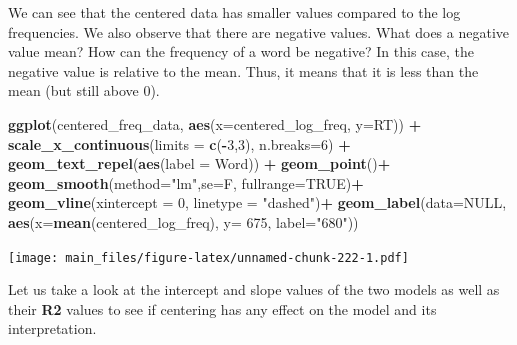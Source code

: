 \documentclass[
]{book}
\newenvironment{Shaded}{\begin{snugshade}}{\end{snugshade}}
\newcommand{\AttributeTok}[1]{\textcolor[rgb]{0.13,0.29,0.53}{#1}}
\newcommand{\ConstantTok}[1]{\textcolor[rgb]{0.56,0.35,0.01}{#1}}
\newcommand{\DecValTok}[1]{\textcolor[rgb]{0.00,0.00,0.81}{#1}}
\newcommand{\FunctionTok}[1]{\textcolor[rgb]{0.13,0.29,0.53}{\textbf{#1}}}
\newcommand{\NormalTok}[1]{#1}
\newcommand{\SpecialCharTok}[1]{\textcolor[rgb]{0.81,0.36,0.00}{\textbf{#1}}}
\newcommand{\StringTok}[1]{\textcolor[rgb]{0.31,0.60,0.02}{#1}}
\begin{document}
We can see that the centered data has smaller values compared to the log frequencies. We also observe that there are negative values. What does a negative value mean? How can the frequency of a word be negative? In this case, the negative value is relative to the mean. Thus, it means that it is less than the mean (but still above 0).

\begin{Shaded}
\begin{Highlighting}[]
\FunctionTok{ggplot}\NormalTok{(centered\_freq\_data, }\FunctionTok{aes}\NormalTok{(}\AttributeTok{x=}\NormalTok{centered\_log\_freq, }\AttributeTok{y=}\NormalTok{RT)) }\SpecialCharTok{+}
  \FunctionTok{scale\_x\_continuous}\NormalTok{(}\AttributeTok{limits =} \FunctionTok{c}\NormalTok{(}\SpecialCharTok{{-}}\DecValTok{3}\NormalTok{,}\DecValTok{3}\NormalTok{), }\AttributeTok{n.breaks=}\DecValTok{6}\NormalTok{) }\SpecialCharTok{+}
  \FunctionTok{geom\_text\_repel}\NormalTok{(}\FunctionTok{aes}\NormalTok{(}\AttributeTok{label =}\NormalTok{ Word)) }\SpecialCharTok{+}
  \FunctionTok{geom\_point}\NormalTok{()}\SpecialCharTok{+}
  \FunctionTok{geom\_smooth}\NormalTok{(}\AttributeTok{method=}\StringTok{"lm"}\NormalTok{,}\AttributeTok{se=}\NormalTok{F, }\AttributeTok{fullrange=}\ConstantTok{TRUE}\NormalTok{)}\SpecialCharTok{+}
  \FunctionTok{geom\_vline}\NormalTok{(}\AttributeTok{xintercept =} \DecValTok{0}\NormalTok{, }\AttributeTok{linetype =} \StringTok{"dashed"}\NormalTok{)}\SpecialCharTok{+}
  \FunctionTok{geom\_label}\NormalTok{(}\AttributeTok{data=}\ConstantTok{NULL}\NormalTok{, }\FunctionTok{aes}\NormalTok{(}\AttributeTok{x=}\FunctionTok{mean}\NormalTok{(centered\_log\_freq), }\AttributeTok{y=} \DecValTok{675}\NormalTok{, }\AttributeTok{label=}\StringTok{"680"}\NormalTok{))}
\end{Highlighting}
\end{Shaded}

\texttt{[image: main\_files/figure-latex/unnamed-chunk-222-1.pdf]}

Let us take a look at the intercept and slope values of the two models as well as their \textbf{R2} values to see if centering has any effect on the model and its interpretation.

\begin{Shaded}
\end{Shaded}
\end{document}

